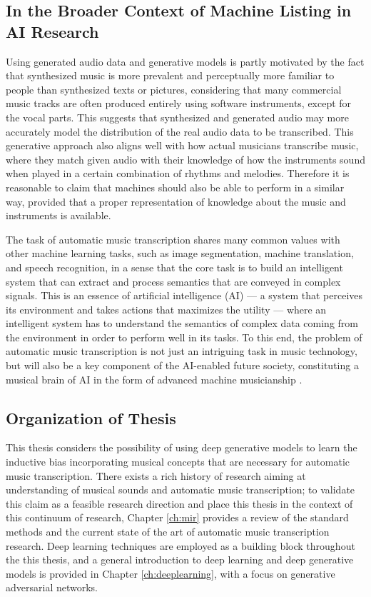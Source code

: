 \fi

\subsection{In the Broader Context of Machine Listing in AI Research}

Using generated audio data and generative models is partly motivated by the fact that synthesized music is more prevalent and perceptually more familiar to people than synthesized texts or pictures, considering that many commercial music tracks are often produced entirely using software instruments, except for the vocal parts.
This suggests that synthesized and generated audio may more accurately model the distribution of the real audio data to be transcribed.
This generative approach also aligns well with how actual musicians transcribe music, where they match given audio with their knowledge of how the instruments sound when played in a certain combination of rhythms and melodies.
Therefore it is reasonable to claim that machines should also be able to perform in a similar way, provided that a proper representation of knowledge about the music and instruments is available.

The task of automatic music transcription shares many common values with other machine learning tasks, such as image segmentation, machine translation, and speech recognition, in a sense that the core task is to build an intelligent system that can extract and process semantics that are conveyed in complex signals.
This is an essence of artificial intelligence (AI)
--- a system that perceives its environment and takes actions that maximizes the utility \cite{russell2009ai} --- 
where an intelligent system has to understand the semantics of complex data coming from the environment in order to perform well in its tasks.
To this end, the problem of automatic music transcription is not just an intriguing task in music technology, but will also be a key component of the AI-enabled future society, constituting a musical brain of AI in the form of advanced machine musicianship \cite{rowe2003musicianship}.


\subsection{Organization of Thesis}


This thesis considers the possibility of using deep generative models to learn the inductive bias incorporating musical concepts that are necessary for automatic music transcription.
There exists a rich history of research aiming at understanding of musical sounds and automatic music transcription; to validate this claim as a feasible research direction and place this thesis in the context of this continuum of research, Chapter \ref{ch:mir} provides a review of the standard methods and the current state of the art of automatic music transcription research.
Deep learning techniques are employed as a building block throughout the this thesis, and a general introduction to deep learning and deep generative models is provided in Chapter \ref{ch:deeplearning}, with a focus on generative adversarial networks.

